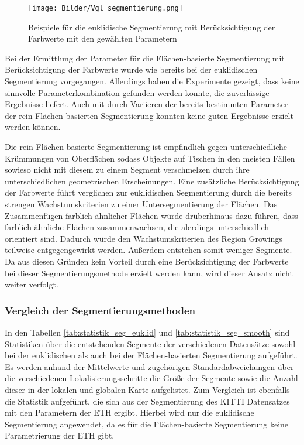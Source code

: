 \begin{figure}[htb]
	\centering
	\label{fig:RGB-Segmentierung}
	\texttt{[image: Bilder/Vgl\_segmentierung.png]}
	\caption{Beispiele für die euklidische Segmentierung mit Berücksichtigung der Farbwerte mit den gewählten Parametern}
\end{figure}

Bei der Ermittlung der Parameter für die Flächen-basierte Segmentierung mit Berücksichtigung der Farbwerte wurde wie bereits bei der euklidischen Segmentierung vorgegangen. Allerdings haben die Experimente gezeigt, dass keine sinnvolle Parameterkombination gefunden werden konnte, die zuverlässige Ergebnisse liefert. Auch mit durch Variieren der bereits bestimmten Parameter der rein Flächen-basierten Segmentierung konnten keine guten Ergebnisse erzielt werden können. 

Die rein Flächen-basierte Segmentierung ist empfindlich gegen unterschiedliche Krümmungen von Oberflächen sodass Objekte auf Tischen  in den meisten Fällen sowieso nicht mit diesem zu einem Segment verschmelzen durch ihre unterschiedlichen geometrischen Erscheinungen. Eine zusätzliche Berücksichtigung der Farbwerte führt verglichen zur euklidischen Segmentierung durch die bereits strengen Wachstumskriterien zu einer Untersegmentierung der Flächen. Das Zusammenfügen farblich ähnlicher Flächen würde drüberhinaus dazu führen, dass farblich ähnliche Flächen zusammenwachsen, die alerdings unterschiedlich  orientiert sind. Dadurch würde den Wachstumskriterien des Region Growings teilweise entgegengewirkt werden. Außerdem entstehen somit weniger Segmente. Da aus diesen Gründen kein Vorteil durch eine Berücksichtigung der Farbwerte bei dieser Segmentierungsmethode erzielt werden kann, wird dieser Ansatz nicht weiter verfolgt. 

\subsubsection{Vergleich der Segmentierungsmethoden}
\label{sec:vgl_segmentierung}

In den Tabellen \ref{tab:statistik_seg_euklid} und \ref{tab:statistik_seg_smooth} sind Statistiken über die entstehenden Segmente der verschiedenen Datensätze sowohl bei der euklidischen als auch bei der Flächen-basierten Segmentierung aufgeführt. Es werden anhand der Mittelwerte und zugehörigen Standardabweichungen über die verschiedenen Lokalisierungsschritte die Größe der Segmente sowie die Anzahl dieser in der lokalen und globalen Karte aufgelistet. Zum Vergleich ist ebenfalls die Statistik aufgeführt, die sich aus der Segmentierung des KITTI Datensatzes mit den Parametern der ETH ergibt. Hierbei wird nur die euklidische Segmentierung angewendet, da es für die Flächen-basierte Segmentierung keine Parametrierung der ETH gibt.  

